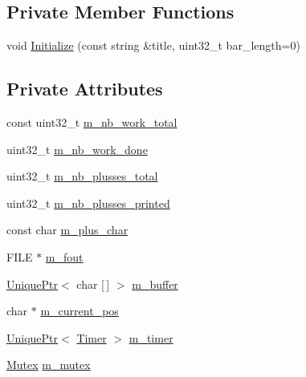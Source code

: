 \subsection*{Private Member Functions}
\begin{DoxyCompactItemize}
\item 
void \hyperlink{classmage_1_1_progress_reporter_a173a7b0097791410d2a513129cbb80b8}{Initialize} (const string \&title, uint32\+\_\+t bar\+\_\+length=0)
\end{DoxyCompactItemize}
\subsection*{Private Attributes}
\begin{DoxyCompactItemize}
\item 
const uint32\+\_\+t \hyperlink{classmage_1_1_progress_reporter_a1b0c8d8f3cde82161b34897c5e95e09b}{m\+\_\+nb\+\_\+work\+\_\+total}
\item 
uint32\+\_\+t \hyperlink{classmage_1_1_progress_reporter_ad3cb941594f138c208fa522a355a985b}{m\+\_\+nb\+\_\+work\+\_\+done}
\item 
uint32\+\_\+t \hyperlink{classmage_1_1_progress_reporter_aeae54fa7c542ccfbdaa44c0942c483fd}{m\+\_\+nb\+\_\+plusses\+\_\+total}
\item 
uint32\+\_\+t \hyperlink{classmage_1_1_progress_reporter_a17d7a4f8b2c8a6de255786f6165726bd}{m\+\_\+nb\+\_\+plusses\+\_\+printed}
\item 
const char \hyperlink{classmage_1_1_progress_reporter_ab3c8d12e79e63ae2b99fde8d6627c230}{m\+\_\+plus\+\_\+char}
\item 
F\+I\+LE $\ast$ \hyperlink{classmage_1_1_progress_reporter_ad325ee5978fd1d16a97acbe37a977982}{m\+\_\+fout}
\item 
\hyperlink{namespacemage_a3316d7143a973e37adf1110f2e80ca31}{Unique\+Ptr}$<$ char \mbox{[}$\,$\mbox{]} $>$ \hyperlink{classmage_1_1_progress_reporter_a725763db34f5bbb7408107d55ee43beb}{m\+\_\+buffer}
\item 
char $\ast$ \hyperlink{classmage_1_1_progress_reporter_a7adafaaf90edf29c8c27f4008aea41c9}{m\+\_\+current\+\_\+pos}
\item 
\hyperlink{namespacemage_a3316d7143a973e37adf1110f2e80ca31}{Unique\+Ptr}$<$ \hyperlink{classmage_1_1_timer}{Timer} $>$ \hyperlink{classmage_1_1_progress_reporter_a4c5c81ce84ceaab7764bd640a18db788}{m\+\_\+timer}
\item 
\hyperlink{structmage_1_1_mutex}{Mutex} \hyperlink{classmage_1_1_progress_reporter_a32a499aa1b8fccbc8393fe32305dfeb1}{m\+\_\+mutex}
\end{DoxyCompactItemize}


